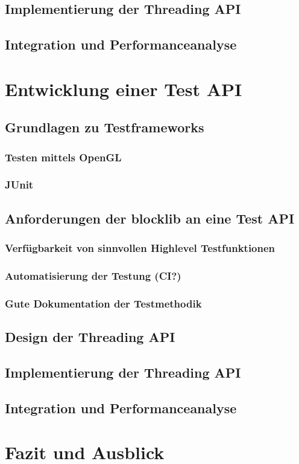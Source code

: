 \documentclass[12pt,a4paper,listof=totocnumbered,parskip=half]{scrreprt}
\begin{document}
\section{Implementierung der Threading API}
\section{Integration und Performanceanalyse}

\chapter{Entwicklung einer Test API}
\section{Grundlagen zu Testframeworks}
\subsection{Testen mittels OpenGL}
\subsection{JUnit}
\section{Anforderungen der blocklib an eine Test API}
\subsection{Verfügbarkeit von sinnvollen Highlevel Testfunktionen}
\subsection{Automatisierung der Testung (CI?)}
\subsection{Gute Dokumentation der Testmethodik}
\section{Design der Threading API}
\section{Implementierung der Threading API}
\section{Integration und Performanceanalyse}

\chapter{Fazit und Ausblick}

\printbibliography[title={Literaturverzeichnis},heading=bibintoc,notkeyword=online]

\printbibliography[title={Quellenverzeichnis},heading=bibintoc,keyword=online] 
\end{document}
